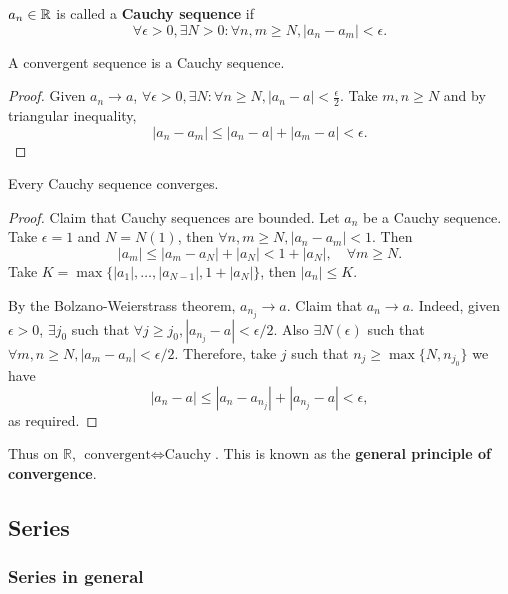 \begin{definition}
    $a_n\in {\mathbb{R}}$ is called a \textbf{Cauchy sequence} if 
    \[
        \forall \epsilon>0, \exists N>0: \forall n,m\ge N, \left| a_n-a_m \right| <\epsilon.
    \]
\end{definition}

\begin{lemma}\label{lma:convergent -> cauchy}
    A convergent sequence is a Cauchy sequence.
\end{lemma}
\begin{proof}
    Given $ a_n\to a $, $ \forall \epsilon>0, \exists N: \forall n\ge N, |a_n-a|<\frac{\epsilon}{2} $. Take $m,n\ge N$ and by triangular inequality,
    \[
        |a_n-a_m|\le |a_n-a|+|a_m-a|<\epsilon.
    \]
\end{proof}

\begin{theorem}\label{thm:cauchy -> convergent}
    Every Cauchy sequence converges.
\end{theorem}
\begin{proof}
    Claim that Cauchy sequences are bounded. Let $a_n$ be a Cauchy sequence. Take $\epsilon=1$ and $N=N(1)$, then $ \forall n,m\ge N, |a_n-a_m|<1 $. Then
    \[
        |a_m|\le |a_m-a_N|+|a_N|<1+|a_N|, \quad \forall m\ge N.
    \]
    Take $ K= \max\{|a_1|,\dots,|a_{N-1}|, 1+|a_N|\} $, then $|a_n|\le K$.

    By the Bolzano-Weierstrass theorem, $ a_{n_j}\to a $. Claim that $a_n\to a$. Indeed, given $ \epsilon>0 $, $ \exists j_0 $ such that $ \forall j\ge j_0, |a_{n_j}-a|<\epsilon/2 $. Also $ \exists N(\epsilon) $ such that $ \forall m,n\ge N, |a_m-a_n|<\epsilon/2 $. Therefore, take $j$ such that $ n_j\ge \max \{N, n_{j_0}\} $ we have
    \[
        \left| a_n-a \right| \le \left| a_n-a_{n_j} \right| + \left| a_{n_j} -a\right| < \epsilon,
    \]
    as required.
\end{proof}
\begin{note}
    Thus on $ \mathbb{R} $, $ \text{convergent} \Leftrightarrow \text{Cauchy} $. This is known as the \textbf{general principle of convergence}.
\end{note}

\subsection{Series}
\subsubsection{Series in general}

